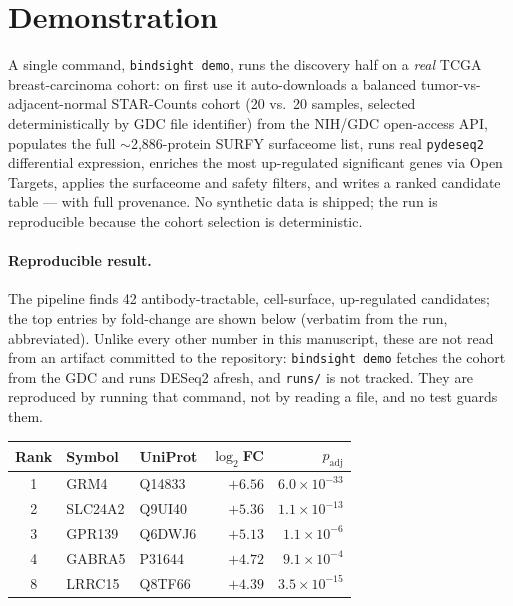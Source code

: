 \documentclass[11pt,letterpaper]{article}
\begin{document}
\section{Demonstration}

A single command, \texttt{bindsight demo}, runs the discovery half on a
\emph{real} TCGA breast-carcinoma cohort: on first use it auto-downloads a
balanced tumor-vs-adjacent-normal STAR-Counts cohort (20 vs.\ 20 samples,
selected deterministically by GDC file identifier) from the NIH/GDC
open-access API, populates the full $\sim$2{,}886-protein SURFY surfaceome
list, runs real \texttt{pydeseq2} differential expression, enriches the most
up-regulated significant genes via Open Targets, applies the surfaceome and
safety filters, and writes a ranked candidate table — with full provenance.
No synthetic data is shipped; the run is reproducible because the cohort
selection is deterministic.

\paragraph{Reproducible result.} The pipeline finds 42 antibody-tractable,
cell-surface, up-regulated candidates; the top entries by fold-change are
shown below (verbatim from the run, abbreviated). Unlike every other number
in this manuscript, these are not read from an artifact committed to the
repository: \texttt{bindsight demo} fetches the cohort from the GDC and runs
DESeq2 afresh, and \texttt{runs/} is not tracked. They are reproduced by
running that command, not by reading a file, and no test guards them.

\vspace{0.4em}
\begin{center}
\begin{tabular}{c l l r r}
\toprule
Rank & Symbol & UniProt & $\log_2$FC & $p_\text{adj}$ \\
\midrule
1 & GRM4    & Q14833 & $+6.56$ & $6.0\times10^{-33}$ \\
2 & SLC24A2 & Q9UI40 & $+5.36$ & $1.1\times10^{-13}$ \\
3 & GPR139  & Q6DWJ6 & $+5.13$ & $1.1\times10^{-6}$ \\
4 & GABRA5  & P31644 & $+4.72$ & $9.1\times10^{-4}$ \\
8 & LRRC15  & Q8TF66 & $+4.39$ & $3.5\times10^{-15}$ \\
\bottomrule
\end{tabular}
\end{center}
\vspace{0.4em}
\end{document}
